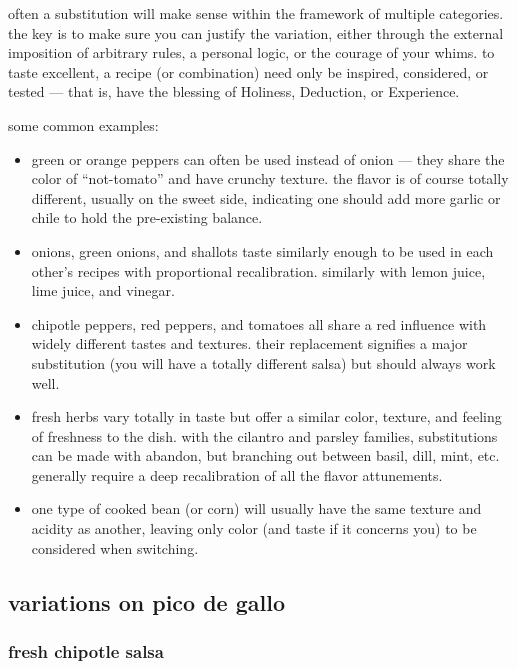 often a substitution will make sense within the framework of multiple
categories. the key is to make sure you can justify the variation,
either through the external imposition of arbitrary rules, a personal
logic, or the courage of your whims. to taste excellent, a recipe (or
combination) need only be inspired, considered, or tested --- that is,
have the blessing of Holiness, Deduction, or Experience.

some common examples:

\begin{itemize}
  \item green or orange peppers can often be used instead of onion ---
  they share the color of ``not-tomato'' and have crunchy texture. the
  flavor is of course totally different, usually on the sweet side,
  indicating one should add more garlic or chile to hold the
  pre-existing balance.

  \item onions, green onions, and shallots taste similarly enough to
  be used in each other's recipes with proportional
  recalibration. similarly with lemon juice, lime juice, and vinegar.

  \item chipotle peppers, red peppers, and tomatoes all share a red
  influence with widely different tastes and textures. their
  replacement signifies a major substitution (you will have a totally
  different salsa) but should always work well.

  \item fresh herbs vary totally in taste but offer a similar color,
  texture, and feeling of freshness to the dish. with the cilantro and
  parsley families, substitutions can be made with abandon, but
  branching out between basil, dill, mint, etc. generally require a
  deep recalibration of all the flavor attunements.

  \item one type of cooked bean (or corn) will usually have the same
  texture and acidity as another, leaving only color (and taste if it
  concerns you) to be considered when switching.
\end{itemize}

\subsection{variations on pico de gallo}

\subsubsection{fresh chipotle salsa}

